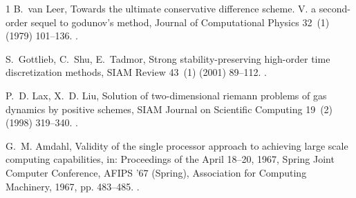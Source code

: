 \documentclass[final,3p,times,twocolumn]{elsarticle}
\begin{document}
\begin{thebibliography}{1}
B.~van Leer, Towards the ultimate conservative difference scheme. {V}. a
  second-order sequel to godunov's method, Journal of Computational Physics
  32~(1) (1979) 101--136.
\newblock \href {https://doi.org/10.1016/0021-9991(79)90145-1}
  {}.

S.~Gottlieb, C.~Shu, E.~Tadmor, Strong stability-preserving high-order time
  discretization methods, SIAM Review 43~(1) (2001) 89--112.
\newblock \href {https://doi.org/10.1137/S003614450036757X}
  {}.

P.~D. Lax, X.~D. Liu, Solution of two-dimensional riemann problems of gas
  dynamics by positive schemes, SIAM Journal on Scientific Computing 19~(2)
  (1998) 319--340.
\newblock \href {https://doi.org/10.1137/S1064827595291819}
  {}.

G.~M. Amdahl, Validity of the single processor approach to achieving large
  scale computing capabilities, in: Proceedings of the April 18--20, 1967,
  Spring Joint Computer Conference, AFIPS '67 (Spring), Association for
  Computing Machinery, 1967, pp. 483--485.
\newblock \href {https://doi.org/10.1145/1465482.1465560}
  {}.

\end{thebibliography}
\end{document}
